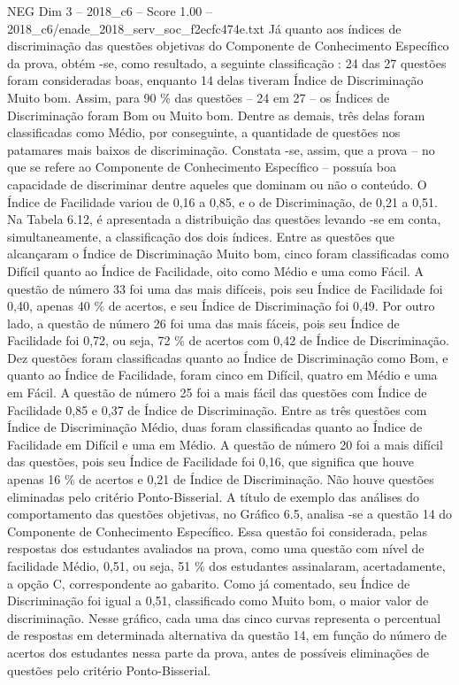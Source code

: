 \begin{textsample}{NEG Dim 3 – 2018\_c6 – Score 1.00 – 2018\_c6/enade\_2018\_serv\_soc\_f2ecfc474e.txt}
Já quanto aos índices de discriminação das questões objetivas do Componente de Conhecimento Específico da prova, obtém -se, como resultado, a seguinte classificação : 24 das 27 questões foram consideradas boas, enquanto 14 delas tiveram Índice de Discriminação Muito bom.
Assim, para 90 \% das questões – 24 em 27 – os Índices de Discriminação foram Bom ou Muito bom.
Dentre as demais, três delas foram classificadas como Médio, por conseguinte, a quantidade de questões nos patamares mais baixos de discriminação.
Constata -se, assim, que a prova – no que se refere ao Componente de Conhecimento Específico – possuía boa capacidade de discriminar dentre aqueles que dominam ou não o conteúdo.
O Índice de Facilidade variou de 0,16 a 0,85, e o de Discriminação, de 0,21 a 0,51.
Na Tabela 6.12, é apresentada a distribuição das questões levando -se em conta, simultaneamente, a classificação dos dois índices.
Entre as questões que alcançaram o Índice de Discriminação Muito bom, cinco foram classificadas como Difícil quanto ao Índice de Facilidade, oito como Médio e uma como Fácil.
A questão de número 33 foi uma das mais difíceis, pois seu Índice de Facilidade foi 0,40, apenas 40 \% de acertos, e seu Índice de Discriminação foi 0,49.
Por outro lado, a questão de número 26 foi uma das mais fáceis, pois seu Índice de Facilidade foi 0,72, ou seja, 72 \% de acertos com 0,42 de Índice de Discriminação.
Dez questões foram classificadas quanto ao Índice de Discriminação como Bom, e quanto ao Índice de Facilidade, foram cinco em Difícil, quatro em Médio e uma em Fácil.
A questão de número 25 foi a mais fácil das questões com Índice de Facilidade 0,85 e 0,37 de Índice de Discriminação.
Entre as três questões com Índice de Discriminação Médio, duas foram classificadas quanto ao Índice de Facilidade em Difícil e uma em Médio.
A questão de número 20 foi a mais difícil das questões, pois seu Índice de Facilidade foi 0,16, que significa que houve apenas 16 \% de acertos e 0,21 de Índice de Discriminação.
Não houve questões eliminadas pelo critério Ponto-Bisserial.
A título de exemplo das análises do comportamento das questões objetivas, no Gráfico 6.5, analisa -se a questão 14 do Componente de Conhecimento Específico.
Essa questão foi considerada, pelas respostas dos estudantes avaliados na prova, como uma questão com nível de facilidade Médio, 0,51, ou seja, 51 \% dos estudantes assinalaram, acertadamente, a opção C, correspondente ao gabarito.
Como já comentado, seu Índice de Discriminação foi igual a 0,51, classificado como Muito bom, o maior valor de discriminação.
Nesse gráfico, cada uma das cinco curvas representa o percentual de respostas em determinada alternativa da questão 14, em função do número de acertos dos estudantes nessa parte da prova, antes de possíveis eliminações de questões pelo critério Ponto-Bisserial.

\end{textsample}
